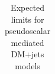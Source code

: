 \begin{table}
\begin{tabular}{rrcccc}
\hline\hline
  \end{tabular}
  \caption{Expected limits for pseudoscalar mediated DM+jets models}
  \label{tab:DMPS_exp}
\end{table}

